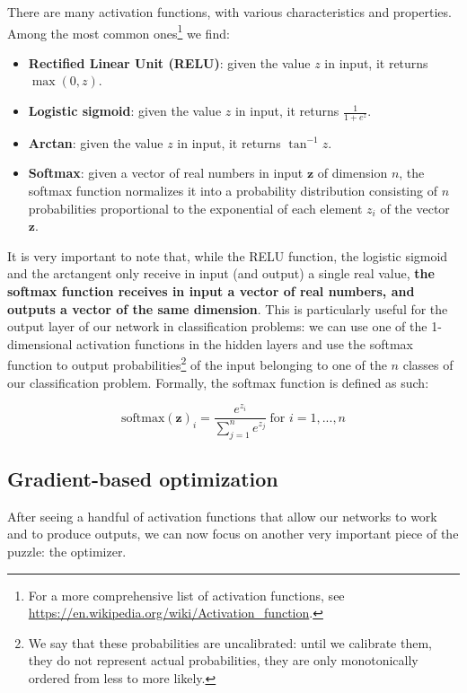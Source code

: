There are many activation functions, with various characteristics and properties. Among the most common ones\footnote{For a more comprehensive list of activation functions, see \url{https://en.wikipedia.org/wiki/Activation_function}.} we find:

\begin{itemize}
    \item \textbf{Rectified Linear Unit (RELU)}: given the value $z$ in input, it returns $\max(0,z)$.
    \item \textbf{Logistic sigmoid}: given the value $z$ in input, it returns $\frac{1}{1+e^z}$.
    \item \textbf{Arctan}: given the value $z$ in input, it returns $\tan^{-1}z$.
    \item \textbf{Softmax}: given a vector of real numbers in input $\boldsymbol{z}$ of dimension $n$, the softmax function normalizes it into a probability distribution consisting of $n$ probabilities proportional to the exponential of each element $z_i$ of the vector $\boldsymbol{z}$.
\end{itemize}

It is very important to note that, while the RELU function, the logistic sigmoid and the arctangent only receive in input (and output) a single real value, \textbf{the softmax function receives in input a vector of real numbers, and outputs a vector of the same dimension}. This is particularly useful for the output layer of our network in classification problems: we can use one of the 1-dimensional activation functions in the hidden layers and use the softmax function to output probabilities\footnote{We say that these probabilities are uncalibrated: until we calibrate them, they do not represent actual probabilities, they are only monotonically ordered from less to more likely.} of the input belonging to one of the $n$ classes of our classification problem. Formally, the softmax function is defined as such:

\begin{equation}
    \text{softmax}(\boldsymbol{z})_i= \frac{e^{z_i}}{\sum_{j=1}^{n} e^{z_j}} \  \text{for } i = 1, ..., n
\end{equation}

\subsection{Gradient-based optimization}
\label{subsection:gradient-based-optimization}
After seeing a handful of activation functions that allow our networks to work and to produce outputs, we can now focus on another very important piece of the puzzle: the optimizer.

